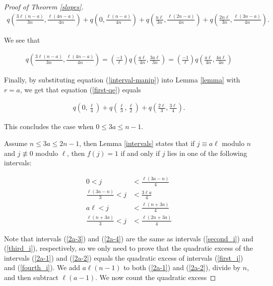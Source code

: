 \documentclass[10pt,a4paper]{amsart}
\begin{document}
\begin{proof}[Proof of Theorem \ref{slopes}]
\begin{align}
    q\left(\frac{3\ell(n-a)}{3n}, \frac{\ell(4n-a)}{4n}\right) + q\left(0, \frac{\ell(n-a)}{4n} \right) + q\left(\frac{n\ell}{3n}, \frac{\ell(2n-a)}{4n} \right) + q\left(\frac{2n\ell}{3n}, \frac{\ell(3n-a)}{4n} \right). \label{first-qe}
\end{align}

We see that

\begin{align}
    q\left(\frac{3\ell(n-a)}{3n}, \frac{\ell(4n-a)}{4n}\right) = \left (\frac{-1}{\ell} \right) q \left(\frac{a\ell}{4n}, \frac{3a\ell}{3n} \right) = \left (\frac{-1}{\ell} \right) q \left(\frac{a\ell}{4n}, \frac{4a\ell}{4n} \right) \label{interval-manip}
\end{align}

Finally, by substituting equation (\ref{interval-manip}) into Lemma \ref{lemma} with $r = a$, we get that equation (\ref{first-qe}) equals

\begin{align*}
    q\left(0, \frac{\ell}{4} \right) + q\left(\frac{\ell}{3}, \frac{\ell}{2} \right) + q\left(\frac{2\ell}{3}, \frac{3\ell}{4} \right).
\end{align*}

This concludes the case when $0 \leq 3a \leq n-1$.

Assume $n \leq 3a \leq 2n-1$, then Lemma \ref{intervals} states that if $j \equiv a\ell$ modulo $n$ and $j \not \equiv 0 $ modulo $\ell$, then $f(j) = 1$ if and only if $j$ lies in one of the following intervals:

\begin{align}
    0 < j& < \frac{\ell(3a-n)}{4} \label{2a-1}\\
    \frac{\ell(3a-n)}{3} < j& < \frac{3\ell a}{4} \label{2a-2}\\
    a\ell < j& < \frac{\ell(n+3a)}{4} \label{2a-3}\\
    \frac{\ell(n+3a)}{3} < j& < \frac{\ell(2n+3a)}{4} \label{2a-4}
\end{align}

Note that intervals (\ref{2a-3}) and (\ref{2a-4}) are the same as intervals (\ref{second_i}) and (\ref{third_i}), respectively, so we only need to prove that the quadratic excess of the intervals (\ref{2a-1}) and (\ref{2a-2}) equals the quadratic excess of intervals (\ref{first_i}) and (\ref{fourth_i}). We add $a\ell(n-1)$ to both (\ref{2a-1}) and (\ref{2a-2}), divide by $n$, and then subtract $\ell(a-1)$. We now count the quadratic excess


\end{proof}
\end{document}
